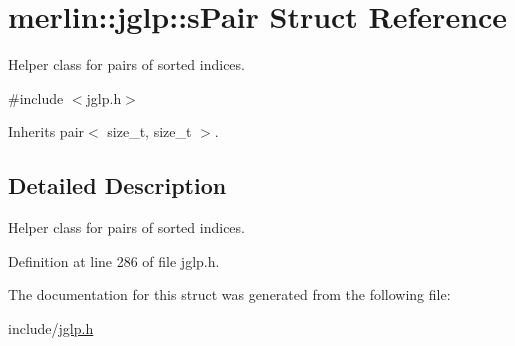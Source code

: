 \hypertarget{structmerlin_1_1jglp_1_1sPair}{}\section{merlin\+:\+:jglp\+:\+:s\+Pair Struct Reference}
\label{structmerlin_1_1jglp_1_1sPair}


Helper class for pairs of sorted indices.  




{\ttfamily \#include $<$jglp.\+h$>$}



Inherits pair$<$ size\+\_\+t, size\+\_\+t $>$.



\subsection{Detailed Description}
Helper class for pairs of sorted indices. 

Definition at line 286 of file jglp.\+h.



The documentation for this struct was generated from the following file\+:\begin{DoxyCompactItemize}
\item 
include/\hyperlink{jglp_8h}{jglp.\+h}\end{DoxyCompactItemize}
